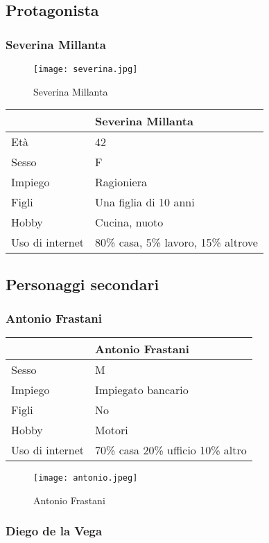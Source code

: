 \documentclass[12pt,italian,]{report}
\begin{document}
\hypertarget{protagonista}{%
\subsection{Protagonista}\label{protagonista}}

\hypertarget{severina-millanta}{%
\subsubsection{Severina Millanta}\label{severina-millanta}}

\begin{figure}
\centering
\texttt{[image: severina.jpg]}
\caption{Severina Millanta}
\end{figure}

\begin{longtable}[]{@{}ll@{}}
\toprule
& Severina Millanta\tabularnewline
\midrule
\endhead
Età & 42\tabularnewline
Sesso & F\tabularnewline
Impiego & Ragioniera\tabularnewline
Figli & Una figlia di 10 anni\tabularnewline
Hobby & Cucina, nuoto\tabularnewline
Uso di internet & 80\% casa, 5\% lavoro, 15\% altrove\tabularnewline
\bottomrule
\end{longtable}

\hypertarget{personaggi-secondari}{%
\subsection{Personaggi secondari}\label{personaggi-secondari}}

\hypertarget{antonio-frastani}{%
\subsubsection{Antonio Frastani}\label{antonio-frastani}}

\begin{longtable}[]{@{}ll@{}}
\toprule
& Antonio Frastani\tabularnewline
\midrule
\endhead
Sesso & M\tabularnewline
Impiego & Impiegato bancario\tabularnewline
Figli & No\tabularnewline
Hobby & Motori\tabularnewline
Uso di internet & 70\% casa 20\% ufficio 10\% altro\tabularnewline
\bottomrule
\end{longtable}

\begin{figure}
\centering
\texttt{[image: antonio.jpeg]}
\caption{Antonio Frastani}
\end{figure}

\hypertarget{diego-de-la-vega}{%
\subsubsection{Diego de la Vega}\label{diego-de-la-vega}}
\end{document}
